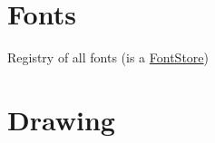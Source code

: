 \documentclass[letterpaper,10pt,english]{sphinxmanual}
\begin{document}
\section{Fonts}
\label{visual:fonts}

\begin{fulllineitems}
\label{visual:visual.serge.visual.Fonts}
Registry of all fonts (is a {\hyperref[visual:fontstore]{FontStore}})

\end{fulllineitems}



\section{Drawing}
\label{visual:drawing}
\end{document}
